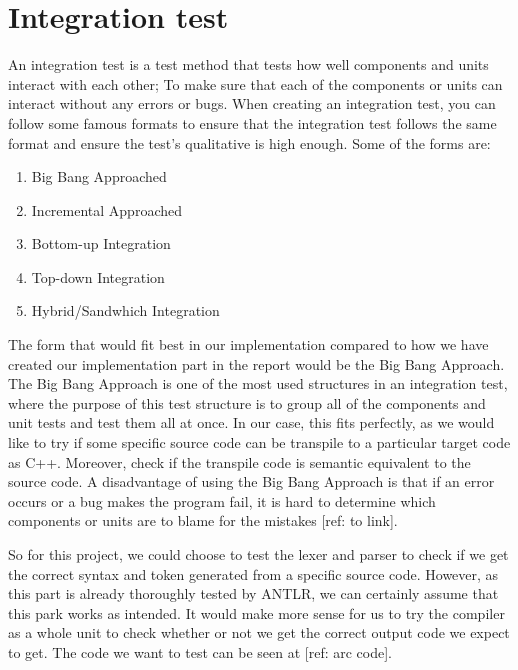 \section{Integration test}\label{subsec:integrationtest}


An integration test is a test method that tests how well components and units interact with each other; To make sure that each of the components or units can interact without any errors or bugs. When creating an integration test, you can follow some famous formats to ensure that the integration test follows the same format and ensure the test's qualitative is high enough. Some of the forms are:

\begin{enumerate}
    \item Big Bang Approached
    \item Incremental Approached
    \item Bottom-up Integration
    \item Top-down Integration
    \item Hybrid/Sandwhich Integration
\end{enumerate}

The form that would fit best in our implementation compared to how we have created our implementation part in the report would be the Big Bang Approach. The Big Bang Approach is one of the most used structures in an integration test, where the purpose of this test structure is to group all of the components and unit tests and test them all at once. In our case, this fits perfectly, as we would like to try if some specific source code can be transpile to a particular target code as C++. Moreover, check if the transpile code is semantic equivalent to the source code. A disadvantage of using the Big Bang Approach is that if an error occurs or a bug makes the program fail, it is hard to determine which components or units are to blame for the mistakes [ref: to link].

So for this project, we could choose to test the lexer and parser to check if we get the correct syntax and token generated from a specific source code. However, as this part is already thoroughly tested by ANTLR, we can certainly assume that this park works as intended. It would make more sense for us to try the compiler as a whole unit to check whether or not we get the correct output code we expect to get. The code we want to test can be seen at [ref: arc code].

